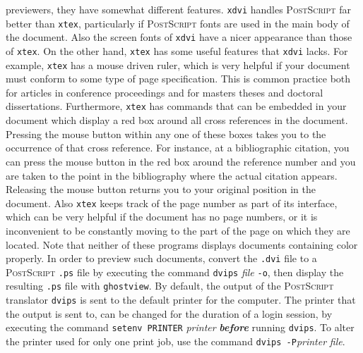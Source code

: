 \documentclass[11pt,titlepage]{article}
\begin{document}
previewers, they have somewhat different features.  \texttt{xdvi} handles
\textsc{PostScript} far better than \texttt{xtex}, particularly if
\textsc{PostScript} fonts are used in the main body of the document.  Also the
screen fonts of \texttt{xdvi} have a nicer appearance than those of
\texttt{xtex}.  On the other hand, \texttt{xtex} has some useful features that
\texttt{xdvi} lacks.  For example, \texttt{xtex} has a mouse driven ruler,
which is very helpful if your document must conform to some type of page
specification.  This is common practice both for articles in conference
proceedings and for masters theses and doctoral dissertations.  Furthermore,
\texttt{xtex} has commands that can be embedded in your document which display
a red box around all cross references in the document.  Pressing the mouse
button within any one of these boxes takes you to the occurrence of that cross
reference.  For instance, at a bibliographic citation, you can press the mouse
button in the red box around the reference number and you are taken to the
point in the bibliography where the actual citation appears.  Releasing the
mouse button returns you to your original position in the document.  Also
\texttt{xtex} keeps track of the page number as part of its interface, which
can be very helpful if the document has no page numbers, or it is inconvenient
to be constantly moving to the part of the page on which they are located.
Note that neither of these programs displays documents containing color
properly.  In order to preview such documents, convert the \texttt{.dvi} file
to a \textsc{PostScript} \texttt{.ps} file by executing the command
\texttt{dvips} \textit{file} \texttt{-o}, then display the resulting
\texttt{.ps} file with \texttt{ghostview}.  By default, the output of the
\textsc{PostScript} translator \texttt{dvips} is sent to the default printer
for the computer.  The printer that the output is sent to, can be changed for
the duration of a login session, by executing the command 
\verb+setenv PRINTER+ \textit{printer} \textbf{\textit{before}} running
\texttt{dvips}.  To alter the printer used for only one print job, use the
command \verb+dvips -P+\textit{printer} \textit{file}.
\end{document}
